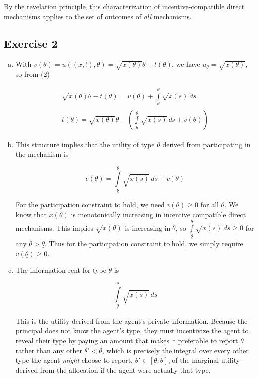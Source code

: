 \documentclass{article}
\begin{document}
By the revelation principle, this characterization of incentive-compatible direct mechanisms applies to the set of outcomes of \textit{all} mechanisms.

\subsection*{Exercise 2}

\begin{enumerate}[(a)]

\item

With $v(\theta) = u((x,t),\theta) = \sqrt{x(\theta)}\theta - t(\theta)$, we have $u_\theta = \sqrt{x(\theta)}$, so from (2)

\begin{gather*}
\sqrt{x(\theta)}\theta - t(\theta) = v(\underline{\theta}) + \int \limits_{\underline{\theta}} ^\theta \sqrt{x(s)} \, ds \\
t(\theta) = \sqrt{x(\theta)}\theta - \left( \int \limits_{\underline{\theta}} ^\theta \sqrt{x(s)} \, ds + v(\underline{\theta})  \right)
\end{gather*}

\item

This structure implies that the utility of type $\theta$ derived from participating in the mechanism is

\begin{equation*}
v(\theta) = \int \limits_{\underline{\theta}} ^\theta \sqrt{x(s)} \, ds + v(\underline{\theta})
\end{equation*}

For the participation constraint to hold, we need $v(\theta) \geq 0$ for all $\theta$. We know that $x(\theta)$ is monotonically increasing in incentive compatible direct mechanisms. This implies $\sqrt{x(\theta)}$ is increasing in $\theta$, so $\int \limits_{\underline{\theta}} ^\theta \sqrt{x(s)} \, ds \geq 0$ for any $\theta > \underline{\theta}$. Thus for the participation constraint to hold, we simply require $v(\underline{\theta}) \geq 0$.

\item 

The information rent for type $\theta$ is 

\begin{equation*}
\int \limits_{\underline{\theta}} ^\theta \sqrt{x(s)} \, ds
\end{equation*}

This is the utility derived from the agent's private information. Because the principal does not know the agent's type, they must incentivize the agent to reveal their type by paying an amount that makes it preferable to report $\theta$ rather than any other $\theta' < \theta$, which is precisely the integral over every other type the agent \textit{might} choose to report, $\theta' \in [\underline{\theta}, \theta]$, of the marginal utility derived from the allocation if the agent were actually that type.


\end{enumerate}
\end{document}
